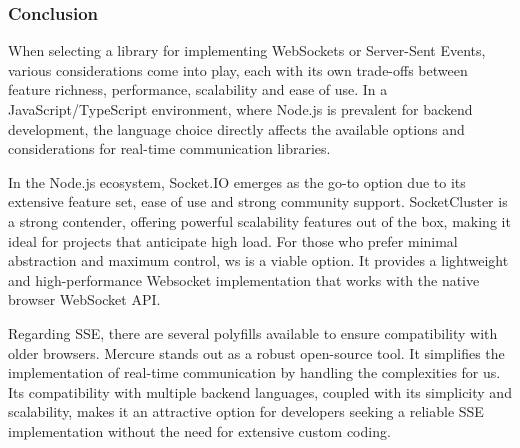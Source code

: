\subsubsection{Conclusion}

When selecting a library for implementing WebSockets or Server-Sent Events, various considerations come into play, each with its own trade-offs between feature richness, performance, scalability and ease of use. In a JavaScript/TypeScript environment, where Node.js is prevalent for backend development, the language choice directly affects the available options and considerations for real-time communication libraries.

In the Node.js ecosystem, Socket.IO emerges as the go-to option due to its extensive feature set, ease of use and strong community support. SocketCluster is a strong contender, offering powerful scalability features out of the box, making it ideal for projects that anticipate high load. For those who prefer minimal abstraction and maximum control, ws is a viable option. It provides a lightweight and high-performance Websocket implementation that works with the native browser WebSocket API.

Regarding SSE, there are several polyfills available to ensure compatibility with older browsers. Mercure stands out as a robust open-source tool. It simplifies the implementation of real-time communication by handling the complexities for us. Its compatibility with multiple backend languages, coupled with its simplicity and scalability, makes it an attractive option for developers seeking a reliable SSE implementation without the need for extensive custom coding.
